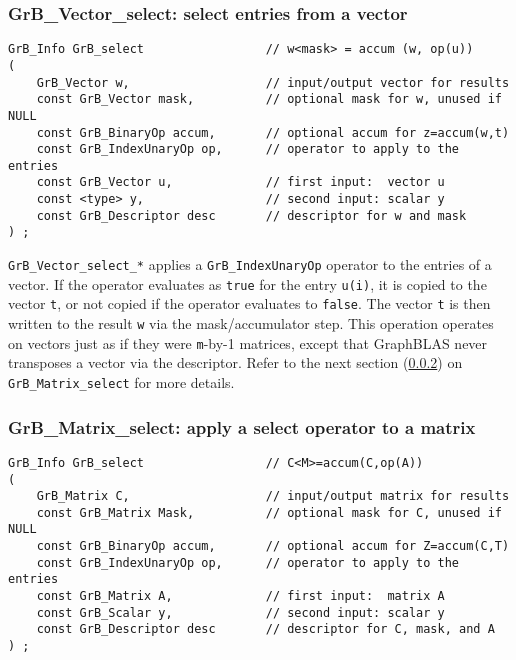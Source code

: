 \documentclass[12pt]{article}
\begin{document}
\subsubsection{{\sf GrB\_Vector\_select:} select entries from a vector}
\label{select_vector}

\begin{mdframed}[userdefinedwidth=6in]
{\footnotesize
\begin{verbatim}
GrB_Info GrB_select                 // w<mask> = accum (w, op(u))
(
    GrB_Vector w,                   // input/output vector for results
    const GrB_Vector mask,          // optional mask for w, unused if NULL
    const GrB_BinaryOp accum,       // optional accum for z=accum(w,t)
    const GrB_IndexUnaryOp op,      // operator to apply to the entries
    const GrB_Vector u,             // first input:  vector u
    const <type> y,                 // second input: scalar y
    const GrB_Descriptor desc       // descriptor for w and mask
) ;
\end{verbatim} } \end{mdframed}

\verb'GrB_Vector_select_*' applies a \verb'GrB_IndexUnaryOp' operator to the
entries of a vector.  If the operator evaluates as \verb'true' for the entry
\verb'u(i)', it is copied to the vector \verb't', or not copied if the operator
evaluates to \verb'false'.   The vector \verb't' is then written to the result
\verb'w' via the mask/accumulator step.  This operation operates on vectors
just as if they were \verb'm'-by-1 matrices, except that GraphBLAS never
transposes a vector via the descriptor.  Refer to the next section
(\ref{select_matrix}) on \verb'GrB_Matrix_select' for more details.

\newpage
\subsubsection{{\sf GrB\_Matrix\_select:} apply a select operator to a matrix}
\label{select_matrix}

\begin{mdframed}[userdefinedwidth=6in]
{\footnotesize
\begin{verbatim}
GrB_Info GrB_select                 // C<M>=accum(C,op(A))
(
    GrB_Matrix C,                   // input/output matrix for results
    const GrB_Matrix Mask,          // optional mask for C, unused if NULL
    const GrB_BinaryOp accum,       // optional accum for Z=accum(C,T)
    const GrB_IndexUnaryOp op,      // operator to apply to the entries
    const GrB_Matrix A,             // first input:  matrix A
    const GrB_Scalar y,             // second input: scalar y
    const GrB_Descriptor desc       // descriptor for C, mask, and A
) ;
\end{verbatim} } \end{mdframed}
\end{document}
